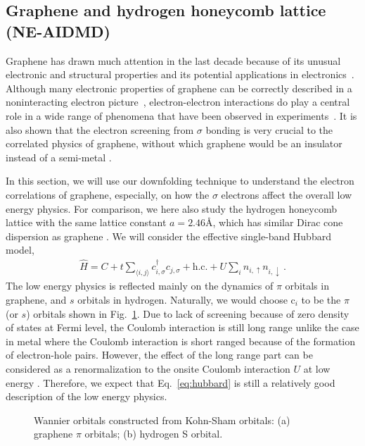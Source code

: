 \documentclass[prl,12pt,onecolumn,nofootinbib,notitlepage,english,superscriptaddress]{revtex4-1}
\begin{document}
\subsection{Graphene and hydrogen honeycomb lattice (NE-AIDMD)}
Graphene has drawn much attention in the last decade because of its unusual electronic and structural properties and its potential applications in electronics~\cite{Wallace1947, Novoselov2004,NovoselovNature2005, Katsnelson2006, Geim2007, Novoselov2007, neto2009, Castro2009}. 
Although many electronic properties of graphene can be correctly described in a noninteracting electron picture~\cite{Castro2009}, electron-electron interactions do play a central role in a wide range of phenomena that have been observed in experiments~\cite{Kotov2012}. It is also shown that the electron screening from $\sigma$ bonding is very crucial to the correlated physics of graphene, without which graphene would be an insulator instead of a semi-metal \cite{Zheng2016} .

In this section, we will use our downfolding technique to understand the electron correlations of graphene, especially, on how the $\sigma$ electrons affect the overall low energy physics. For comparison, we here also study the hydrogen honeycomb lattice with the same lattice constant $a=2.46$\AA, which has similar Dirac cone dispersion as graphene \cite{Zheng2016}.  We will consider the effective single-band Hubbard model, 
\begin{eqnarray}\label{eq:hubbard}
\hat{H} = C + t\sum_{\langle i,j\rangle}c_{i, \sigma}^\dagger c_{j, \sigma} + \text{h.c.} + U\sum_{i}n_{i, \uparrow}n_{i, \downarrow}\,. 
\end{eqnarray}
The low energy physics is reflected mainly on the dynamics of $\pi$ orbitals in  graphene, and $s$ orbitals in hydrogen. Naturally, we would choose c$_i$ to be the $\pi$ (or $s$) orbitals shown in Fig.~\ref{fig:wan}. Due to lack of screening because of zero density of states at Fermi level, the Coulomb interaction is still long range unlike the case in metal where the Coulomb interaction is short ranged because of the formation of electron-hole pairs. However, the effect of the long range part can be considered as a renormalization to the onsite Coulomb interaction $U$ at low energy \cite{Schuler2013, Changlani2015}. Therefore, we expect that Eq.~\eqref{eq:hubbard} is still a relatively good description of the low energy physics. 

\begin{figure}[hbt]
  \centering  
       \caption{Wannier orbitals constructed from Kohn-Sham orbitals: (a) graphene $\pi$ orbitals; (b) hydrogen S orbital. }
\label{fig:wan}
\end{figure}
\end{document}
